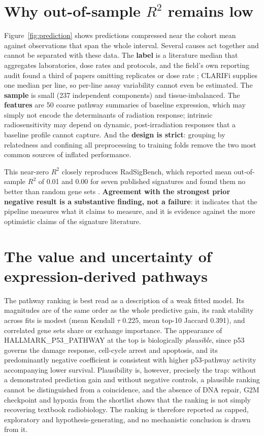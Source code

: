 \section{Why out-of-sample $R^2$ remains low}

Figure~\ref{fig:prediction} shows predictions compressed near the cohort mean against
observations that span the whole interval. Several causes act together and cannot be
separated with these data. The \textbf{label} is a literature median that aggregates
laboratories, dose rates and protocols, and the field's own reporting audit found a third of
papers omitting replicates or dose rate \parencite{oike2020}; CLARIFi supplies one median per
line, so per-line assay variability cannot even be estimated. The \textbf{sample} is small
(237 independent components) and tissue-imbalanced. The \textbf{features} are 50 coarse
pathway summaries of baseline expression, which may simply not encode the determinants of
radiation response; intrinsic radiosensitivity may depend on dynamic, post-irradiation
responses that a baseline profile cannot capture. And the \textbf{design is strict}: grouping
by relatedness and confining all preprocessing to training folds remove the two most common
sources of inflated performance.

This near-zero $R^2$ closely reproduces RadSigBench, which reported mean out-of-sample $R^2$
of 0.01 and 0.00 for seven published signatures and found them no better than random gene
sets \parencite{oconnor2022}. \textbf{Agreement with the strongest prior negative result is a
substantive finding, not a failure}: it indicates that the pipeline measures what it claims
to measure, and it is evidence against the more optimistic claims of the signature
literature.

\section{The value and uncertainty of expression-derived pathways}

The pathway ranking is best read as a description of a weak fitted model. Its magnitudes are
of the same order as the whole predictive gain, its rank stability across fits is modest
(mean Kendall $\tau$ 0.225, mean top-10 Jaccard 0.391), and correlated gene sets share or
exchange importance. The appearance of HALLMARK\_P53\_PATHWAY at the top is biologically
\emph{plausible}, since p53 governs the damage response, cell-cycle arrest and apoptosis, and
its predominantly negative coefficient is consistent with higher p53-pathway activity
accompanying lower survival. Plausibility is, however, precisely the trap: without a
demonstrated prediction gain and without negative controls, a plausible ranking cannot be
distinguished from a coincidence, and the absence of DNA repair, G2M checkpoint and hypoxia
from the shortlist shows that the ranking is not simply recovering textbook radiobiology. The
ranking is therefore reported as capped, exploratory and hypothesis-generating, and no
mechanistic conclusion is drawn from it.

